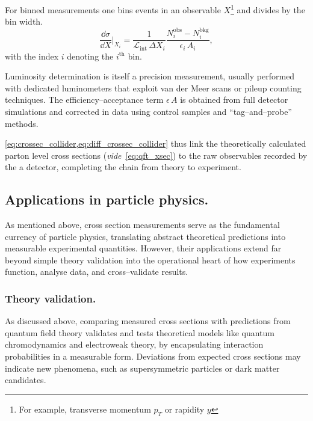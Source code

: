         For binned measurements one bins events in an observable \(X\)\footnote{For example, transverse momentum \(p_T\) or rapidity \(y\)} and divides by the bin width.
        \begin{equation}
          \frac{\dd\sigma}{\dd X}\Big|_{X_i}
          = \frac{1}{\mathcal{L}_{\text{int}}\,\Delta X_i}
            \frac{N_i^{\text{obs}} - N_i^{\text{bkg}}}
                 {\epsilon_i\,A_i},
          \label{eq:diff_crossec_collider}
        \end{equation}
        with the index \(i\) denoting the \(i^{\text{th}}\) bin.

        Luminosity determination is itself a precision measurement, usually performed with dedicated luminometers that exploit van der Meer scans or pileup counting techniques.
        The efficiency--acceptance term \(\epsilon\,A\) is obtained from full detector simulations and corrected in data using control samples and ``tag--and--probe'' methods.

        \cref{eq:crossec_collider,eq:diff_crossec_collider} thus link the theoretically calculated parton level cross sections (\textit{vide}~\cref{eq:qft_xsec}) to the raw observables recorded by the a detector, completing the chain from theory to experiment.

    \subsection{Applications in particle physics.}
        As mentioned above, cross section measurements serve as the fundamental currency of particle physics, translating abstract theoretical predictions into measurable experimental quantities.
        However, their applications extend far beyond simple theory validation into the operational heart of how experiments function, analyse data, and cross--validate results.
        \subsubsection{Theory validation.}
            As discussed above, comparing measured cross sections with predictions from quantum field theory validates and tests theoretical models like quantum chromodynamics and electroweak theory, by encapsulating interaction probabilities in a measurable form.
            Deviations from expected cross sections may indicate new phenomena, such as supersymmetric particles or dark matter candidates.
            
